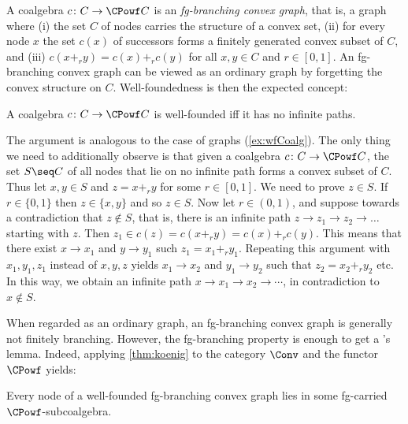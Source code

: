 \documentclass[a4paper,UKenglish, autoref, numberwithinsect, final]{lipics-v2021}
\numberwithin{equation}{section}
\newenvironment{proofhere}[2][Proof of]{%
  \proof{#1~\autoref{#2}}%
}{%
  \endproof%
  \par%
}
\newenvironment{proofappendix}[2][Proof of]{%
    \begin{proofhere}[#1]{#2}
  }{%
    \end{proofhere}
  }
\theoremstyle{plain}
\theoremstyle{definition}
\begin{document}
A coalgebra $c\colon C\to \CPowf C$ is an \emph{fg-branching convex graph}, that is, a graph where (i) the set $C$ of nodes carries the structure of a convex set, (ii) for every node $x$ the set $c(x)$ of successors forms a finitely generated convex subset of $C$, and (iii) $c(x+_r y)=c(x)+_r c(y)$ for all $x,y\in C$ and $r\in [0,1]$. An fg-branching convex graph can be viewed as an ordinary graph by forgetting the convex structure on $C$. Well-foundedness is then the expected concept:

\begin{lemma}\label{lem:convex-well-founded}
A coalgebra $c\colon C\to \CPowf C$ is well-founded iff it has no infinite paths.
\end{lemma}

\begin{proofappendix}{lem:convex-well-founded}
The argument is analogous to the case of graphs (\autoref{ex:wfCoalg}). The only thing we need to additionally observe is that given a coalgebra $c\colon C\to \CPowf C$, the set $S\seq C$ of all nodes that lie on no infinite path forms a convex subset of $C$. Thus let $x,y\in S$ and $z=x+_r y$ for some $r\in [0,1]$. We need to prove $z\in S$. If $r\in \{0,1\}$ then $z\in \{x,y\}$ and so $z\in S$. Now let $r\in (0,1)$, and suppose towards a contradiction that $z\not\in S$, that is, there is an infinite path $z\to z_1 \to z_2\to\ldots$ starting with $z$. Then $z_1\in c(z)=c(x+_r y) = c(x)+_r c(y)$. This means that there exist $x\to x_1$ and $y\to y_1$ such $z_1=x_1+_r y_1$. Repeating this argument with $x_1,y_1,z_1$ instead of $x,y,z$ yields $x_1\to x_2$ and $y_1\to y_2$ such that $z_2=x_2+_r y_2$ etc. In this way, we obtain an infinite path $x\to x_1\to x_2\to \cdots$, in  contradiction to $x\not\in S$.    
\end{proofappendix}



When regarded as an ordinary graph, an fg-branching convex graph is generally not finitely branching. However, the fg-branching property is enough to get a \Konig's lemma. Indeed, applying \autoref{thm:koenig} to the category $\Conv$ and the functor $\CPowf$ yields:

\begin{theorem}\label{thm:koenig-convex}
Every node of a well-founded fg-branching convex graph lies in some fg-carried $\CPowf$-subcoalgebra.
\end{theorem}
\end{document}
